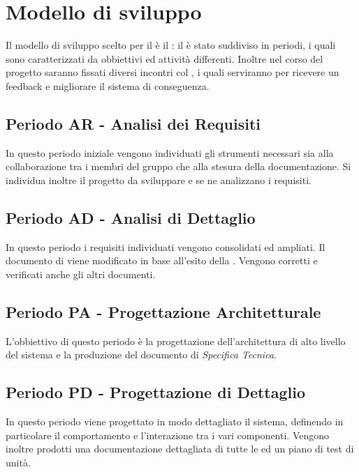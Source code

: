 \documentclass[./PianoDiProgetto.tex]{subfiles}
\begin{document}
  \section{Modello di sviluppo}

  Il modello di sviluppo scelto per il  è il : il
   è stato suddiviso in periodi, i quali sono caratterizzati da
  obbiettivi ed attività differenti. Inoltre nel corso del progetto saranno
  fissati diversi incontri col , i quali serviranno per ricevere un
  feedback e migliorare il sistema di conseguenza.

  \subsection{Periodo AR - Analisi dei Requisiti}

  In questo periodo iniziale vengono individuati gli strumenti necessari sia alla
  collaborazione tra i membri del gruppo che alla stesura della documentazione.
  Si individua inoltre il progetto da sviluppare e se ne analizzano i requisiti.

  \subsection{Periodo AD - Analisi di Dettaglio}

  In questo periodo i requisiti individuati vengono consolidati ed ampliati. Il
  documento di \ARdocRR{} viene modificato in base all'esito
  della \RR. Vengono corretti e verificati anche gli altri documenti.

  \subsection{Periodo PA - Progettazione Architetturale}

  L'obbiettivo di questo periodo è la progettazione dell'architettura di alto
  livello del sistema e la produzione del documento di \textit{Specifica Tecnica}.

  \subsection{Periodo PD - Progettazione di Dettaglio}

  In questo periodo viene progettato in modo dettagliato il sistema, definendo
  in particolare il comportamento e l'interazione tra i vari componenti. Vengono
  inoltre prodotti una documentazione dettagliata di tutte le  ed un piano
  di test di unità.
\end{document}
